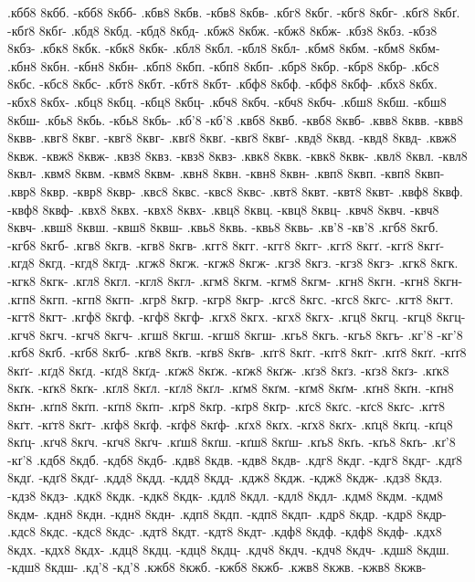 {.кбб8 8кбб. -кбб8 8кбб-
.кбв8 8кбв. -кбв8 8кбв-
.кбг8 8кбг. -кбг8 8кбг-
.кбґ8 8кбґ. -кбґ8 8кбґ-
.кбд8 8кбд. -кбд8 8кбд-
.кбж8 8кбж. -кбж8 8кбж-
.кбз8 8кбз. -кбз8 8кбз-
.кбк8 8кбк. -кбк8 8кбк-
.кбл8 8кбл. -кбл8 8кбл-
.кбм8 8кбм. -кбм8 8кбм-
.кбн8 8кбн. -кбн8 8кбн-
.кбп8 8кбп. -кбп8 8кбп-
.кбр8 8кбр. -кбр8 8кбр-
.кбс8 8кбс. -кбс8 8кбс-
.кбт8 8кбт. -кбт8 8кбт-
.кбф8 8кбф. -кбф8 8кбф-
.кбх8 8кбх. -кбх8 8кбх-
.кбц8 8кбц. -кбц8 8кбц-
.кбч8 8кбч. -кбч8 8кбч-
.кбш8 8кбш. -кбш8 8кбш-
.кбь8 8кбь. -кбь8 8кбь-
.кб'8 -кб'8
.квб8 8квб. -квб8 8квб-
.квв8 8квв. -квв8 8квв-
.квг8 8квг. -квг8 8квг-
.квґ8 8квґ. -квґ8 8квґ-
.квд8 8квд. -квд8 8квд-
.квж8 8квж. -квж8 8квж-
.квз8 8квз. -квз8 8квз-
.квк8 8квк. -квк8 8квк-
.квл8 8квл. -квл8 8квл-
.квм8 8квм. -квм8 8квм-
.квн8 8квн. -квн8 8квн-
.квп8 8квп. -квп8 8квп-
.квр8 8квр. -квр8 8квр-
.квс8 8квс. -квс8 8квс-
.квт8 8квт. -квт8 8квт-
.квф8 8квф. -квф8 8квф-
.квх8 8квх. -квх8 8квх-
.квц8 8квц. -квц8 8квц-
.квч8 8квч. -квч8 8квч-
.квш8 8квш. -квш8 8квш-
.квь8 8квь. -квь8 8квь-
.кв'8 -кв'8
.кгб8 8кгб. -кгб8 8кгб-
.кгв8 8кгв. -кгв8 8кгв-
.кгг8 8кгг. -кгг8 8кгг-
.кгґ8 8кгґ. -кгґ8 8кгґ-
.кгд8 8кгд. -кгд8 8кгд-
.кгж8 8кгж. -кгж8 8кгж-
.кгз8 8кгз. -кгз8 8кгз-
.кгк8 8кгк. -кгк8 8кгк-
.кгл8 8кгл. -кгл8 8кгл-
.кгм8 8кгм. -кгм8 8кгм-
.кгн8 8кгн. -кгн8 8кгн-
.кгп8 8кгп. -кгп8 8кгп-
.кгр8 8кгр. -кгр8 8кгр-
.кгс8 8кгс. -кгс8 8кгс-
.кгт8 8кгт. -кгт8 8кгт-
.кгф8 8кгф. -кгф8 8кгф-
.кгх8 8кгх. -кгх8 8кгх-
.кгц8 8кгц. -кгц8 8кгц-
.кгч8 8кгч. -кгч8 8кгч-
.кгш8 8кгш. -кгш8 8кгш-
.кгь8 8кгь. -кгь8 8кгь-
.кг'8 -кг'8
.кґб8 8кґб. -кґб8 8кґб-
.кґв8 8кґв. -кґв8 8кґв-
.кґг8 8кґг. -кґг8 8кґг-
.кґґ8 8кґґ. -кґґ8 8кґґ-
.кґд8 8кґд. -кґд8 8кґд-
.кґж8 8кґж. -кґж8 8кґж-
.кґз8 8кґз. -кґз8 8кґз-
.кґк8 8кґк. -кґк8 8кґк-
.кґл8 8кґл. -кґл8 8кґл-
.кґм8 8кґм. -кґм8 8кґм-
.кґн8 8кґн. -кґн8 8кґн-
.кґп8 8кґп. -кґп8 8кґп-
.кґр8 8кґр. -кґр8 8кґр-
.кґс8 8кґс. -кґс8 8кґс-
.кґт8 8кґт. -кґт8 8кґт-
.кґф8 8кґф. -кґф8 8кґф-
.кґх8 8кґх. -кґх8 8кґх-
.кґц8 8кґц. -кґц8 8кґц-
.кґч8 8кґч. -кґч8 8кґч-
.кґш8 8кґш. -кґш8 8кґш-
.кґь8 8кґь. -кґь8 8кґь-
.кґ'8 -кґ'8
.кдб8 8кдб. -кдб8 8кдб-
.кдв8 8кдв. -кдв8 8кдв-
.кдг8 8кдг. -кдг8 8кдг-
.кдґ8 8кдґ. -кдґ8 8кдґ-
.кдд8 8кдд. -кдд8 8кдд-
.кдж8 8кдж. -кдж8 8кдж-
.кдз8 8кдз. -кдз8 8кдз-
.кдк8 8кдк. -кдк8 8кдк-
.кдл8 8кдл. -кдл8 8кдл-
.кдм8 8кдм. -кдм8 8кдм-
.кдн8 8кдн. -кдн8 8кдн-
.кдп8 8кдп. -кдп8 8кдп-
.кдр8 8кдр. -кдр8 8кдр-
.кдс8 8кдс. -кдс8 8кдс-
.кдт8 8кдт. -кдт8 8кдт-
.кдф8 8кдф. -кдф8 8кдф-
.кдх8 8кдх. -кдх8 8кдх-
.кдц8 8кдц. -кдц8 8кдц-
.кдч8 8кдч. -кдч8 8кдч-
.кдш8 8кдш. -кдш8 8кдш-
.кд'8 -кд'8
.кжб8 8кжб. -кжб8 8кжб-
.кжв8 8кжв. -кжв8 8кжв-
}
